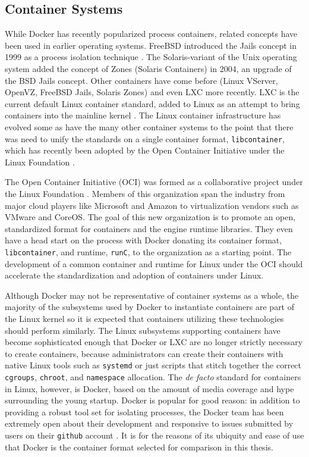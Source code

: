 \subsection{Container Systems} %
\label{sec:container_systems}
While Docker has recently popularized process containers, related concepts have been used in earlier operating systems.
FreeBSD introduced the Jails concept in 1999 as a process isolation technique \autocite{_zones_1}.  
The Solaris-variant of the Unix operating system added the concept of Zones (Solaris Containers) in 2004, an upgrade of the BSD Jails concept.  
Other containers have come before (Linux VServer, OpenVZ, FreeBSD Jails, Solaris Zones) and even LXC more recently.  
LXC is the current default Linux container standard, added to Linux as an attempt to bring containers into the mainline kernel \autocite{dockersecurity1}.
The Linux container infrastructure has evolved some as have the many other container systems to the point that there was need to unify the standards on a single container format, \texttt{libcontainer}, which has recently been adopted by the Open Container Initiative under the Linux Foundation \autocite{_oci_1}.  

The Open Container Initiative (OCI) was formed as a collaborative project under the Linux Foundation \autocite{_oci_1}.
Members of this organization span the industry from major cloud players like Microsoft and Amazon to virtualization vendors such as VMware and CoreOS.  
The goal of this new organization is to promote an open, standardized format for containers and the engine runtime libraries. 
They even have a head start on the process with Docker donating its container format, \texttt{libcontainer}, and runtime, \texttt{runC}, to the organization as a starting point.
The development of a common container and runtime for Linux under the OCI should accelerate the standardization and adoption of containers under Linux.

Although Docker may not be representative of container systems as a whole, the majority of the subsystems used by Docker to instantiate containers are part of the Linux kernel so it is expected that containers utilizing these technologies should perform similarly.  
The Linux subsystems supporting containers have become sophisticated enough that Docker or LXC are no longer strictly necessary to create containers, because administrators can create their containers with native Linux  tools such as \texttt{systemd} or just scripts that stitch together the correct \texttt{cgroups}, \texttt{chroot}, and \texttt{namespace} allocation. 
The \emph{de facto} standard for containers in Linux, however, is Docker, based on the amount of media coverage and hype surrounding the young startup.  
Docker is popular for good reason: in addition to providing a robust tool set for isolating processes, the Docker team has been extremely open about their development and responsive to issues submitted by users on their \texttt{github} account \autocite{githubdocker}.  
It is for the reasons of its ubiquity and ease of use that Docker is the container format selected for comparison in this thesis.

